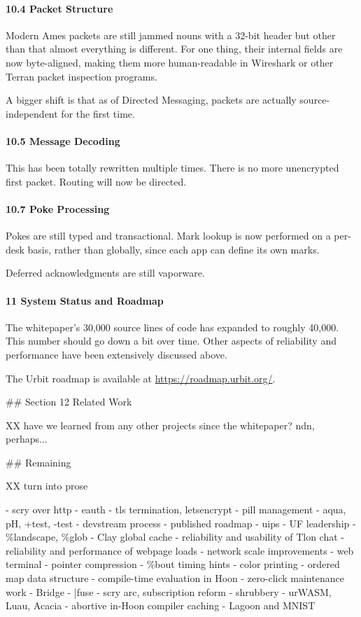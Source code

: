\documentclass[twoside]{article}
\begin{document}
\paragraph{10.4 Packet Structure}  Modern Ames packets are still jammed nouns with a 32-bit header but other than that almost everything is different.  For one thing, their internal fields are now byte-aligned, making them more human-readable in Wireshark or other Terran packet inspection programs.

A bigger shift is that as of Directed Messaging, packets are actually source-independent for the first time.

\paragraph{10.5 Message Decoding}  This has been totally rewritten multiple times.  There is no more unencrypted first packet.  Routing will now be directed.

\paragraph{10.7 Poke Processing}  Pokes are still typed and transactional.  Mark lookup is now performed on a per-desk basis, rather than globally, since each app can define its own marks.

Deferred acknowledgments are still vaporware.

\paragraph{11 System Status and Roadmap}  The whitepaper's 30,000 source lines of code has expanded to roughly 40,000.  This number should go down a bit over time.  Other aspects of reliability and performance have been extensively discussed above.

The Urbit roadmap is available at \url{https://roadmap.urbit.org/}.

\#\# Section 12 Related Work

XX have we learned from any other projects since the whitepaper?  {\sc ndn}, perhaps...

\#\# Remaining

XX turn into prose

- scry over {\sc http}
- eauth
- {\sc tls} termination, letsencrypt
- pill management
- aqua, pH, +test, -test
- devstream process
- published roadmap
- {\sc uip}s
- UF leadership
- \%landscape, \%glob
- Clay global cache
- reliability and usability of Tlon chat
- reliability and performance of webpage loads
- network scale improvements
- web terminal
- pointer compression
- \%bout timing hints
- color printing
- ordered map data structure
- compile-time evaluation in Hoon
- zero-click maintenance work
- Bridge
- |fuse
- scry arc, subscription reform
- shrubbery
- urWASM, Luau, Acacia
- abortive in-Hoon compiler caching
- Lagoon and MNIST
\end{document}
